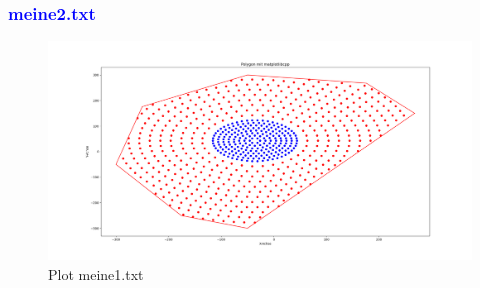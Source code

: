 \documentclass{article}
\begin{document}
\subsubsection{\textcolor{blue}{meine2.txt}}
\begin{figure}[H]
    \centering
    \includegraphics[width=1\textwidth]{Bilder/Figure_7.png}
    \caption{Plot meine1.txt}
\end{figure}
\end{document}

